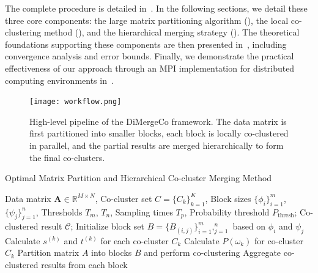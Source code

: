 \documentclass[journal]{IEEEtran}
\begin{document}
The complete procedure is detailed in~. In the following sections, we detail these three core components: the large matrix partitioning algorithm (), the local co-clustering method (), and the hierarchical merging strategy (). The theoretical foundations supporting these components are then presented in~, including convergence analysis and error bounds. Finally, we demonstrate the practical effectiveness of our approach through an MPI implementation for distributed computing environments in~.

\begin{figure}[t]
    \centering
    \texttt{[image: workflow.png]} %
    \caption{High-level pipeline of the DiMergeCo framework. The data matrix is first partitioned into smaller blocks, each block is locally co-clustered in parallel, and the partial results are merged hierarchically to form the final co-clusters.}
    \label{fig:DiMergeCo-pipeline}
\end{figure}


\begin{algorithm}[!t]
    \caption{Optimal Matrix Partition and Hierarchical Co-cluster Merging Method}
    \begin{algorithmic}[1]
        \REQUIRE Data matrix $\mathbf{A} \in \mathbb{R}^{M \times N}$, Co-cluster set $C = \{C_k\}_{k=1}^K$, Block sizes $\{\phi_i\}_{i=1}^m$, $\{\psi_j\}_{j=1}^n$, Thresholds $T_m$, $T_n$, Sampling times $T_p$, Probability threshold $P_\text{thresh}$;
        \ENSURE Co-clustered result $\mathcal{C}$;
        \STATE Initialize block set $B = \{B_{(i,j)}\}_{i=1}^m,_{j=1}^n$ based on $\phi_i$ and $\psi_j$
        \STATE Calculate $s^{(k)}$ and $t^{(k)}$ for each co-cluster $C_k$
        \STATE Calculate $P(\omega_k)$ for co-cluster $C_k$
        \STATE Partition matrix $A$ into blocks $B$ and perform co-clustering
        \STATE Aggregate co-clustered results from each block
        \ENDIF
        \ENDFOR
        \
    \end{algorithmic}
    \label{alg:method}
\end{algorithm}
\end{document}
